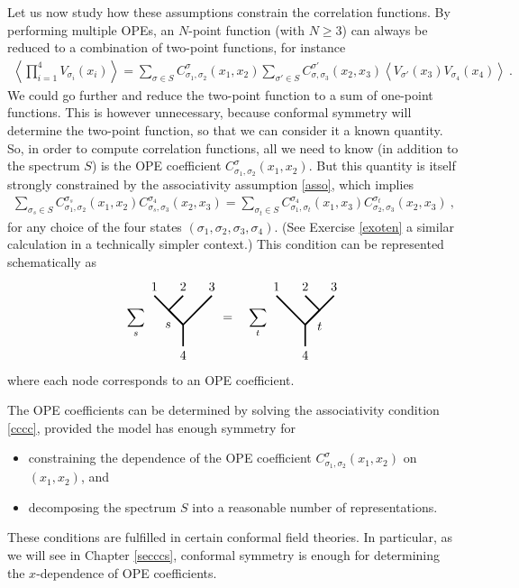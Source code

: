 \documentclass[12pt,a4paper,notitlepage]{report}
\numberwithin{equation}{section}
\theoremstyle{break}
\begin{document}
Let us now study how these assumptions constrain the correlation functions.
By performing multiple OPEs, an $N$-point function (with $N\geq 3$) can always be reduced to a combination of two-point functions, for instance
\begin{align}
 \left\langle \prod_{i=1}^4 V_{\sigma_i}(x_i) \right\rangle = \sum_{\sigma\in S} C_{\sigma_1,\sigma_2}^{\sigma}(x_1,x_2)\sum_{\sigma'\in S} C_{\sigma,\sigma_3}^{\sigma'}(x_2,x_3)\left\langle V_{\sigma'}(x_3)V_{\sigma_4}(x_4)\right\rangle\ .
\end{align}
We could go further and reduce the two-point function to a sum of one-point functions.
This is however unnecessary, because conformal symmetry will determine the two-point function, so that we can consider it a known quantity.
So, in order to compute correlation functions, all we need to know (in addition to the spectrum $S$) is the OPE coefficient $C_{\sigma_1,\sigma_2}^{\sigma}(x_1,x_2)$.
But this quantity is itself strongly constrained by the associativity assumption \eqref{asso}, which implies
\begin{align}
 \sum_{\sigma_s\in S} C_{\sigma_1,\sigma_2}^{\sigma_s}(x_1,x_2) C_{\sigma_s,\sigma_3}^{\sigma_4}(x_2,x_3) = \sum_{\sigma_t\in S} C_{\sigma_1,\sigma_t}^{\sigma_4}(x_1,x_3)C_{\sigma_2,\sigma_3}^{\sigma_t}(x_2,x_3)\ ,
\label{cccc}
\end{align}
for any choice of the four states $(\sigma_1,\sigma_2,\sigma_3,\sigma_4)$.
(See Exercise \ref{exoten} a similar calculation in a technically simpler context.) This condition can be represented schematically as 
\begin{align}
\sum_{s} 
 \begin{tikzpicture}[scale = .2, baseline=(current  bounding  box.center), very thick]
  \draw (-4,3) node [above] {$1$} -- (0, -1) -- (4, 3) node [above] {$3$};
  \draw (0, 3) node [above] {$2$} -- (-2, 1) -- node [below left] {$s$} (0, -1) -- (0, -4) node [below] {$4$};
 \end{tikzpicture}
= \quad
\sum_{t} 
\begin{tikzpicture}[scale = .2, baseline=(current  bounding  box.center), very thick]
  \draw (-4,3) node [above] {$1$} -- (0, -1) -- (4, 3) node [above] {$3$};
  \draw (0, 3) node [above] {$2$} -- (2, 1) -- node [below right] {$t$} (0, -1) -- (0, -4) node [below] {$4$};
  \end{tikzpicture}
\label{sdsd}
\end{align}
where each node corresponds to an OPE coefficient. 

The OPE coefficients can be determined by solving the associativity condition \eqref{cccc}, provided the model has enough symmetry for 
\begin{itemize}
 \item constraining the dependence of the OPE coefficient $C_{\sigma_1,\sigma_2}^{\sigma}(x_1,x_2)$ on $(x_1,x_2)$, and
\item decomposing the spectrum $S$ into a reasonable number of representations.
\end{itemize}
These conditions are fulfilled in certain conformal field theories.
In particular, as we will see in Chapter \ref{secccs}, conformal symmetry is enough for determining the $x$-dependence of OPE coefficients. 
\end{document}
